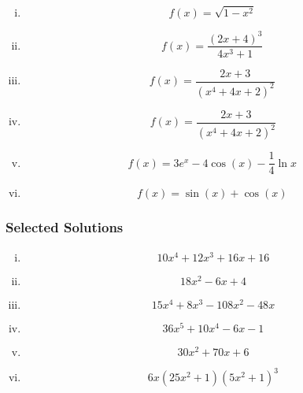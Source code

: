 \documentclass[]{article}
\begin{document}
\begin{multicols}{2}
\begin{enumerate}[(i)]
		\item 		 \[ f(x) = \sqrt{1-x^2} \,\] %
		\item 		 \[ f(x) = \frac{(2x+4)^3}{4x^3+1} \,\] %
		\item 		\[ f(x) = \frac{2x+3}{(x^4+4x+2)^2} \,\] 
		\item \[f(x) = \frac{2x+3}{(x^4+4x+2)^2}\]
		
		\item  \[f(x) = 3e^x-4\cos (x) - \frac{1}{4}\ln x\,\]
		\item \[f(x) = \sin(x)+\cos(x)\,\]
		
	\end{enumerate}
\end{multicols}

\subsubsection*{Selected Solutions}
\begin{multicols}{2}
	\begin{enumerate}[(i)]
		\item		 \[ 10x^4+12x^3+16x+16\]
		\item			 \[ 18x^2-6x+4\]
		\item	 \[ 15x^4+8x^3-108x^2-48x\]
		\item		 \[ 36x^5+10x^4-6x-1\]
		\item		 \[ 30x^2+70x+6\]
		\item		 \[ 6x(25x^2+1)(5x^2+1)^3\]
	\end{enumerate}
\end{multicols}
\end{document}
